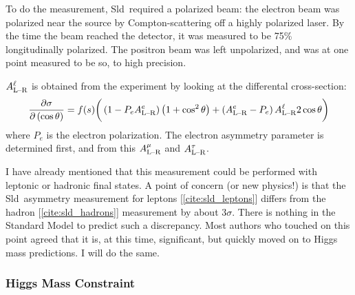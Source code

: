 \documentclass[12pt]{article}
\def\sld{{\sc Sld}}
\begin{document}
To do the measurement, \sld\ required a polarized beam: the electron
beam was polarized near the source by Compton-scattering off a highly
polarized laser. By the time the beam reached the detector, it was
measured to be 75\% longitudinally polarized. The positron beam was
left unpolarized, and was at one point measured to be so, to high
precision.

$A^\ell_{\mbox{\scriptsize L--R}}$ is obtained from the experiment by looking at
the differental cross-section:
\begin{equation}
  \frac{\partial \sigma}{\partial \left(\cos\theta\right)} = f(s)
  \bigg(\left(1 - P_e A^e_{\mbox{\scriptsize L--R}}\right) \left(1 +
  \cos^2\theta\right) + \left(A^e_{\mbox{\scriptsize L--R}} - P_e\right)
  A^\ell_{\mbox{\scriptsize L--R}} 2 \cos\theta \bigg)
\end{equation}
where $P_e$ is the electron polarization. The electron asymmetry
parameter is determined first, and from this $A^\mu_{\mbox{\scriptsize L--R}}$
and $A^\tau_{\mbox{\scriptsize L--R}}$.

I have already mentioned that this measurement could be performed with
leptonic or hadronic final states. A point of concern (or new
physics!) is that the \sld\ asymmetry measurement for leptons
[\ref{cite:sld_leptons}] differs from the hadron
[\ref{cite:sld_hadrons}] measurement by about 3$\sigma$. There is
nothing in the Standard Model to predict such a discrepancy. Most
authors who touched on this point agreed that it is, at this time,
significant, but quickly moved on to Higgs mass predictions. I will do
the same.

\subsubsection{Higgs Mass Constraint}
\end{document}
